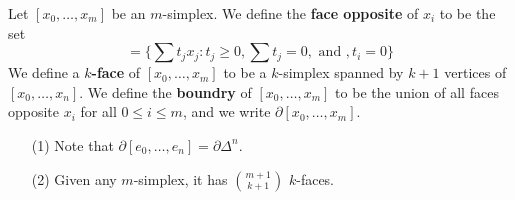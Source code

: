 \begin{definition}
    Let $[x_0, \dots, x_m]$ be an $m$-simplex. We define the \textbf{face
    opposite} of $x_i$ to be the set
    \begin{equation*}
        [x_0, \dots \hat{x_i}, \dots x_m]=\{\sum{t_jx_j} : t_j \geq 0,
        \sum{t_j}=0, \text{ and }, t_i=0\}
    \end{equation*}
    We define a \textbf{$k$-face} of $[x_0, \dots, x_m]$ to be a $k$-simplex
    spanned by $k+1$ vertices of  $[x_0, \dots, x_n]$. We define the
    \textbf{boundry} of $[x_0, \dots, x_m]$ to be the union of all faces
    opposite $x_i$ for all  $0 \leq i \leq m$, and we write  $\partial{[x_0,
    \dots, x_m]}$.
\end{definition}

\begin{example}\label{}
    \begin{enumerate}
        \item[(1)] Note that $\partial{[e_0, \dots, e_n]}=\partial{\Delta^n}$.

        \item[(2)] Given any $m$-simplex, it has  ${m+1 \choose k+1}$ $k$-faces.
    \end{enumerate}
\end{example}

